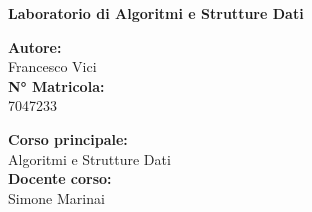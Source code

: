 

\begin{titlepage}
	
	
	\HR
	
	\begin{CENTER}
		\textbf{ Laboratorio di Algoritmi e Strutture Dati}
	\end{CENTER}
	
	\HR
	
	\vspace{3em}

	\begin{MINIBOX}
		
		\textbf{Autore:}\\
		Francesco Vici\\[1.2em]
		\textbf{N° Matricola:}\\
		7047233	\\[1.2em]
		
	
	\end{MINIBOX}
	\hfill
	\begin{MINIBOX-RIGHT}
		
		\textbf{Corso principale:} \\
		Algoritmi e Strutture Dati\\[1.2em]
		\textbf{Docente corso:}\\
		Simone Marinai\\[1.2em]
		
	\end{MINIBOX-RIGHT}	
		

	
\end{titlepage}

\newpage

\tableofcontents 

\newpage
